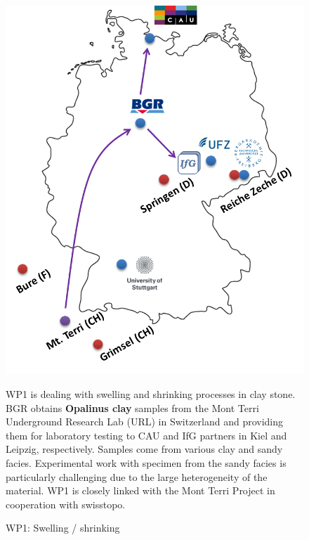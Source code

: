 \begin{figure}[h!]
\begin{minipage}{0.48\textwidth}
\includegraphics[width=\textwidth]{figures/geomint-wp1.png}
\caption{WP1: Swelling / shrinking}
\end{minipage}
\hfill
\begin{minipage}{0.48\textwidth}
WP1 is dealing with swelling and shrinking processes in clay stone. BGR obtains \textbf{Opalinus clay} samples from the Mont Terri Underground Research Lab (URL) in Switzerland and providing them for laboratory testing to CAU and IfG partners in Kiel and Leipzig, respectively. Samples come from various clay and sandy facies. Experimental work with specimen from the sandy facies is particularly challenging due to the large heterogeneity of the material. WP1 is closely linked with the Mont Terri Project in cooperation with swisstopo.
\end{minipage}
\end{figure}

